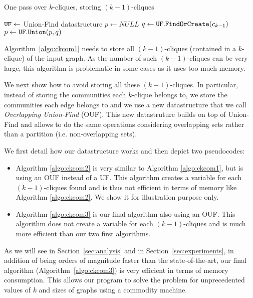 \vspace{0.3cm}

\begin{algorithm}[!htbp]
\caption{One pass over $k$-cliques, storing $(k-1)$-cliques}
\label{algo:ckcom1}
\begin{algorithmic}[1]
  \State ${\tt UF} \leftarrow$ Union-Find datastructure 
        \State $p \leftarrow NULL$
      		\State $q\leftarrow {\tt UF.FindOrCreate} (c_{k-1})$
          	\State $p \leftarrow {\tt UF.Union}(p,q) $
      	\EndFor
    \EndFor
\end{algorithmic}
\end{algorithm}

Algorithm~\ref{algo:ckcom1} needs to store all $(k-1)$-cliques (contained in a $k$-clique) of the input graph. As the number of such $(k-1)$-cliques can be very large, this algorithm is problematic in some cases as it uses too much memory.

We next show how to avoid storing all these $(k-1)$-cliques. In particular, instead of storing the communities each $k$-clique belongs to, we store the communities each edge belongs to and we use a new datastructure that we call {\it Overlapping Union-Find} (OUF). This new datastruture builds on top of Union-Find and allows to do the same operations considering overlapping sets rather than a partition (i.e. non-overlapping sets).

We first detail how our datastructure works and then depict two pseudocodes:
\begin{itemize}
\item Algorithm \ref{algo:ckcom2} is very similar to Algorithm \ref{algo:ckcom1}, but is using an OUF instead of a UF. This 
algorithm creates a variable for each $(k-1)$-cliques found and is thus not efficient in terms of memory like Algorithm \ref{algo:ckcom2}. We show it for illustration purpose only.
\item Algorithm \ref{algo:ckcom3} is our final algorithm also using an OUF. This algorithm does not create a variable for each $(k-1)$-cliques and is much more efficient than our two first algorithms.
\end{itemize}

As we will see in Section~\ref{sec:analysis} and in Section~\ref{sec:experiments}, in addition of being orders of magnitude faster than the state-of-the-art, our final algorithm (Algorithm~\ref{algo:ckcom3}) is very efficient in terms of memory consumption. This allows our program to solve the problem for unprecedented values of $k$ and sizes of graphs using a commodity machine.

